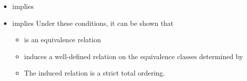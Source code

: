 \begin{addedblock}
\begin{itemdescr}
{\begin{itemize}
\item
{}
implies
\item
{}
implies
\enternote
Under these conditions, it can be shown that
\begin{itemize}
\item
{}
is an equivalence relation
\item
{}
induces a well-defined relation on the equivalence
classes determined by
\item
The induced relation is a strict total ordering.
\exitnote
\end{itemize}
\end{itemize}
}
\end{itemdescr}
\end{addedblock}
